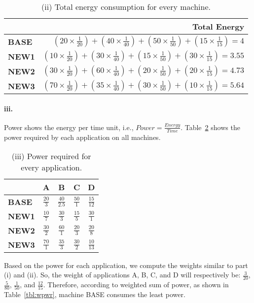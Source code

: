 \documentclass[11pt]{article}
\renewcommand{\part}[1]{\paragraph*{{#1}.}}
\begin{document}
\begin{table}[h]
\center
\begin{tabular}{|l|r|}
	\hline
	 & \textbf{Total Energy} \\
	\hline
	\textbf{BASE} & $(20 \times \frac{1}{20}) + (40 \times \frac{1}{40}) + 
	(50 \times \frac{1}{50}) + (15 \times \frac{1}{15}) = 4$  \\
	\hline
	\textbf{NEW1} & $(10 \times \frac{1}{20}) + (30 \times \frac{1}{40}) + 
	(15 \times \frac{1}{50}) + (30 \times \frac{1}{15}) = 3.55$ \\
	\hline
	\textbf{NEW2} & $(30 \times \frac{1}{20}) + (60 \times \frac{1}{40}) + 
	(20 \times \frac{1}{50}) + (20 \times \frac{1}{15}) = 4.73$ \\
	\hline
	\textbf{NEW3} & $(70 \times \frac{1}{20}) + (35 \times \frac{1}{40}) + 
	(30 \times \frac{1}{50}) + (10 \times \frac{1}{15}) = 5.64$ \\
	\hline
\end{tabular}
\caption{(ii) Total energy consumption for every machine.}
\label{tbl:wenrgy}
\end{table}


\part{iii} Power shows the energy per time unit, i.e., $Power = 
\frac{Energy}{Time}$. Table~\ref{tbl:power} shows the power required by 
each application on all machines.

\begin{table}[h]
\center
\begin{tabular}{|l|c|c|c|c|}
	\hline
	 & \textbf{A} & \textbf{B} & \textbf{C} & \textbf{D} \\
	\hline
	\textbf{BASE} & $\frac{20}{3}$ & $\frac{40}{2.5}$ & $\frac{50}{1}$ 
	& $\frac{15}{12}$ \\
	\hline
	\textbf{NEW1} & $\frac{10}{7}$ & $\frac{30}{3}$ & $\frac{15}{5}$ 
	& $\frac{30}{1}$ \\
	\hline
	\textbf{NEW2} & $\frac{30}{2}$ & $\frac{60}{1}$ & $\frac{20}{3}$ 
	& $\frac{20}{8}$ \\
	\hline
	\textbf{NEW3} & $\frac{70}{1}$ & $\frac{35}{3}$ & $\frac{30}{2}$ 
	& $\frac{10}{13}$ \\
	\hline
\end{tabular}
\caption{(iii) Power required for every application.}
\label{tbl:power}
\end{table}

Based on the power for each application, we compute the weights similar to 
part (i) and (ii). So, the weight of applications A, B, C, and D will respectively 
be: $\frac{3}{20}$, $\frac{5}{80}$, $\frac{1}{50}$, and $\frac{12}{15}$. 
Therefore, according to weighted sum of power, as shown in 
Table~\ref{tbl:wpwr}, machine BASE consumes the least power.
\end{document}
